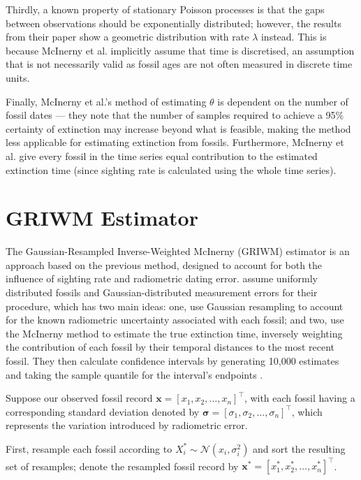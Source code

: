 Thirdly, a known property of stationary Poisson processes is that the gaps between observations should be exponentially distributed; however, the results from their paper show a geometric distribution with rate $\lambda$ instead. This is because McInerny et al. implicitly assume that time is discretised, an assumption that is not necessarily valid as fossil ages are not often measured in discrete time units.

Finally, McInerny et al.'s method of estimating $\theta$ is dependent on the number of fossil dates --- they note that the number of samples required to achieve a 95\% certainty of extinction may increase beyond what is feasible, making the method less applicable for estimating extinction from fossils. Furthermore, McInerny et al. give every fossil in the time series equal contribution to the estimated extinction time (since sighting rate is calculated using the whole time series).

\section{GRIWM Estimator}

The Gaussian-Resampled Inverse-Weighted McInerny (GRIWM) estimator is an approach based on the previous \citet{Mcinerny2006} method, designed to account for both the influence of sighting rate and radiometric dating error. \citet{Bradshaw2012} assume uniformly distributed fossils and Gaussian-distributed measurement errors for their procedure, which has two main ideas: one, use Gaussian resampling to account for the known radiometric uncertainty associated with each fossil; and two, use the McInerny method to estimate the true extinction time, inversely weighting the contribution of each fossil by their temporal distances to the most recent fossil. They then calculate confidence intervals by generating 10,000 estimates and taking the sample quantile for the interval's endpoints \cite{Bradshaw2012}.

Suppose our observed fossil record $\bm{x} = [x_1, x_2, \dots, x_n]^\top$, with each fossil having a corresponding standard deviation denoted by $\bm{\sigma}=[\sigma_1, \sigma_2, \dots, \sigma_n]^\top$, which represents the variation introduced by radiometric error.

First, resample each fossil according to $X^*_i \sim \mathcal{N}(x_i, \sigma_i^2)$ and sort the resulting set of resamples; denote the resampled fossil record by $\bm{x^*} = [x^*_1, x^*_2, \dots, x^*_n]^\top$.

